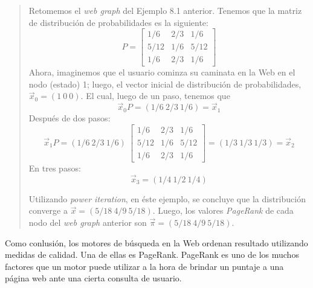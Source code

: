 			\begin{quote}
				Retomemos el \textit{web graph} del Ejemplo 8.1 anterior. Tenemos que la matriz de distribución de probabilidades es la siguiente:
				\[
				P =
				\begin{bmatrix}
					1/6 & 2/3 & 1/6 \\
					5/12 & 1/6 & 5/12 \\
					1/6 & 2/3 & 1/6
				\end{bmatrix}
				\]
				Ahora, imaginemos que el usuario cominza su caminata en la Web en el nodo (estado) 1; luego, el vector inicial de distribución de probabilidades, $\vec{x}_0 = (1 \ 0 \ 0)$. El cual, luego de un paso, tenemos que
				\begin{equation}
					\vec{x}_0 P = (1/6 \ 2/3 \ 1/6) = \vec{x}_1
				\end{equation}
				Después de dos pasos:
				\begin{equation}
					\vec{x}_1 P = (1/6 \ 2/3 \ 1/6) \ \begin{bmatrix}
														1/6 & 2/3 & 1/6 \\
														5/12 & 1/6 & 5/12 \\
														1/6 & 2/3 & 1/6	
													\end{bmatrix} = (1/3 \ 1/3 \ 1/3) = \vec{x}_2
				\end{equation}
				En tres pasos:
				\begin{equation}
					\vec{x}_3 = (1/4 \ 1/2 \ 1/4)
				\end{equation}
				
				Utilizando \textit{power iteration}, en éste ejemplo, se concluye que la distribución converge a $\vec{x} = (5/18 \ 4/9 \ 5/18)$. Luego, los valores \textit{PageRank} de cada nodo del \textit{web graph} anterior son $\vec{\pi} = (5/18 \ 4/9 \ 5/18)$.
			\end{quote}
			
			Como conlusión, los motores de búsqueda en la Web ordenan resultado utilizando medidas de calidad. Una de ellas es PageRank. PageRank es uno de los muchos factores que un motor puede utilizar a la hora de brindar un puntaje a una página web ante una cierta consulta de usuario.